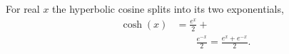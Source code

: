 \documentclass{article}
\begin{document}
For real $x$ the hyperbolic cosine splits into its two exponentials,
\begin{align}
\cosh(x) &= \frac{e^{x}}{2} + \nonumber\\
&\qquad \frac{e^{-x}}{2} = \frac{e^{x}+e^{-x}}{2} .
\label{eq:ch}
\end{align}
\end{document}

